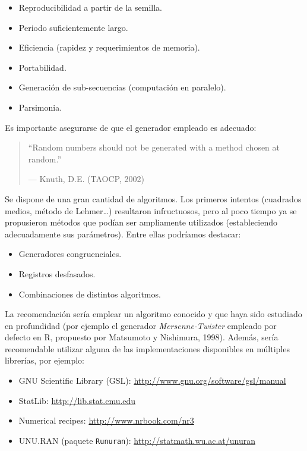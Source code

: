 \documentclass[
]{book}
\theoremstyle{break}
\theoremstyle{nonumberplain}
\begin{document}
\begin{itemize}
\item
  Reproducibilidad a partir de la semilla.
\item
  Periodo suficientemente largo.
\item
  Eficiencia (rapidez y requerimientos de memoria).
\item
  Portabilidad.
\item
  Generación de sub-secuencias (computación en paralelo).
\item
  Parsimonia.
\end{itemize}

Es importante asegurarse de que el generador empleado es adecuado:

\begin{quote}
``Random numbers should not be generated with a method chosen at random.''

--- Knuth, D.E. (TAOCP, 2002)
\end{quote}

Se dispone de una gran cantidad de algoritmos.
Los primeros intentos (cuadrados medios, método de Lehmer\ldots) resultaron infructuosos, pero al poco tiempo ya se propusieron métodos que podían ser ampliamente utilizados (estableciendo adecuadamente sus parámetros).
Entre ellas podríamos destacar:

\begin{itemize}
\item
  Generadores congruenciales.
\item
  Registros desfasados.
\item
  Combinaciones de distintos algoritmos.
\end{itemize}

La recomendación sería emplear un algoritmo conocido y que haya sido estudiado en profundidad (por ejemplo el generador \emph{Mersenne-Twister} empleado por defecto en R, propuesto por Matsumoto y Nishimura, 1998).
Además, sería recomendable utilizar alguna de las implementaciones disponibles en múltiples librerías, por ejemplo:

\begin{itemize}
\item
  GNU Scientific Library (GSL):
  \href{http://www.gnu.org/software/gsl/manual/html_node/Random-Number-Generation.html}{http://www.gnu.org/software/gsl/manual}
\item
  StatLib: \url{http://lib.stat.cmu.edu}
\item
  Numerical recipes: \url{http://www.nrbook.com/nr3}
\item
  UNU.RAN (paquete \texttt{Runuran}):
  \url{http://statmath.wu.ac.at/unuran}
\end{itemize}
\end{document}

